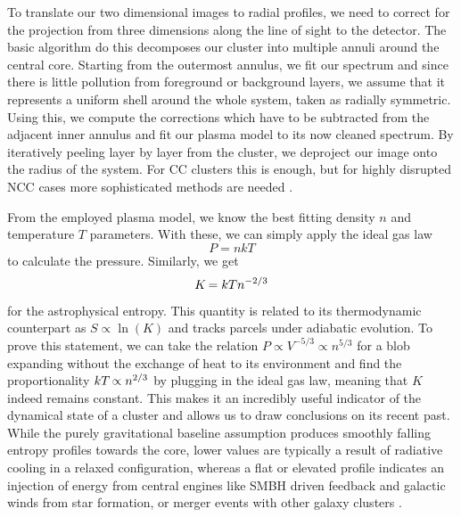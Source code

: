 To translate our two dimensional images to radial profiles, we need to correct for the projection from three dimensions along the
line of sight to the detector. The basic algorithm do this decomposes our cluster into multiple annuli around the central core.
Starting from the outermost annulus, we fit our spectrum and since there is little pollution from foreground or background layers,
we assume that it represents a uniform shell around the whole system, taken as radially symmetric. Using this, we compute the
corrections which have to be subtracted from the adjacent inner annulus and fit our plasma model to its now cleaned spectrum. By
iteratively peeling layer by layer from the cluster, we deproject our image onto the radius of the system. For CC clusters this
is enough, but for highly disrupted NCC cases more sophisticated methods are needed \cite{boeh2010}.

From the employed plasma model, we know the best fitting density $n$ and temperature $T$ parameters. With these, we can simply apply
the ideal gas law
\begin{equation*}
	P = nkT
\end{equation*}
to calculate the pressure. Similarly, we get
\begin{equation*}
	K \kern-1pt= kT n^{-2/3}
\end{equation*}
for the astrophysical entropy. This quantity is related to its thermodynamic counterpart as $S \propto \ln(K)$ and tracks parcels
under adiabatic evolution. To prove this statement, we can take the relation $P \propto V^{-5/3} \propto n^{5/3}$ for a blob expanding
without the exchange of heat to its environment and find the proportionality $kT \kern-1pt\propto n^{2/3}$ by plugging in the ideal gas
law, meaning that $K$ indeed remains constant. This makes it an incredibly useful indicator of the dynamical state of a cluster and
allows us to draw conclusions on its recent past. While the purely gravitational baseline assumption produces smoothly falling entropy
profiles towards the core, lower values are typically a result of radiative cooling in a relaxed configuration, whereas a flat or elevated
profile indicates an injection of energy from central engines like SMBH driven feedback and galactic winds from star formation, or merger
events with other galaxy clusters \cite{boeh2010, sara1986, rosa2002}.

